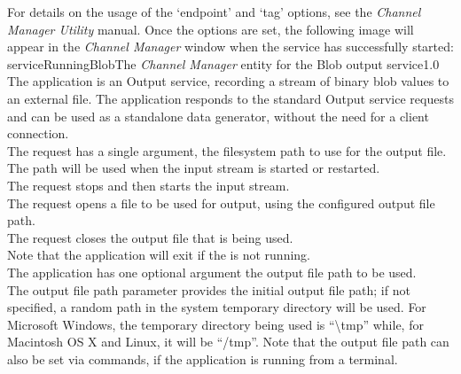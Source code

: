 For details on the usage of the `endpoint' and `tag' options, see the \emph{Channel
Manager Utility} manual.
Once the options are set, the following image will appear in the \emph{Channel Manager}
window when the service has successfully started:
%
{serviceRunningBlob}{The \emph{Channel Manager} entity for the Blob output service}{1.0}
\condPage
{}
The  application is an Output service, recording
a stream of \yarp{} binary blob values to an external file.
The application responds to the standard Output service requests and can be used as a
standalone data generator, without the need for a client connection.\\

The  request has a single argument,
the file\longDash{}system path to use for the output file.
The path will be used when the input stream is started or restarted.\\

The  request stops and then
starts the input stream.\\

The  request opens a file to be
used for output, using the configured output file path.\\

The  request closes the output
file that is being used.\\

Note that the application will exit if the
 is not running.\\

The application has one optional argument \longDash{} the output file path to be used.
\insertAppParameters
{}
\insertOutputServiceComment\\

The output file path parameter provides the initial output file path; if not specified, a
random path in the system temporary directory will be used.
For Microsoft Windows, the temporary directory being used is ``\textbackslash{}tmp''
while, for Macintosh OS X and Linux, it will be ``/tmp''.
Note that the output file path can also be set via commands, if the application is
running from a terminal.\\

